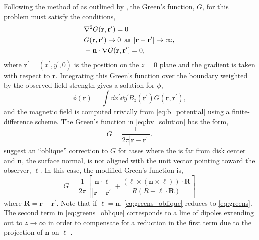 Following the method of \citet{schmidt_observable_1964} as outlined by \citet{sakurai_greens_1982}, the Green's function, $G$, for this problem must satisfy the conditions,
\begin{align}
    &\nabla^2G(\mathbf{r},\mathbf{r}^\prime) = 0, \nonumber \\
    &G(\mathbf{r},\mathbf{r}^\prime) \to 0 \enspace \textup{as} \enspace |\mathbf{r}-\mathbf{r}^\prime|\to\infty, \nonumber \\
    &-\mathbf{n}\cdot\nabla G(\mathbf{r},\mathbf{r}^\prime) = 0, \nonumber
\end{align} 
where $\mathbf{r}^\prime=(x^\prime,y^\prime,0)$ is the position on the $z=0$ plane and the gradient is taken with respect to $\mathbf{r}$. Integrating this Green's function over the boundary weighted by the observed field strength gives a solution for $\phi$,
\begin{equation}\label{eq:bv_solution}
    \phi(\mathbf{r}) = \int\dd{x^\prime}\dd{y^\prime}B_z(\mathbf{r}^\prime)G(\mathbf{r},\mathbf{r}^\prime),
\end{equation}
and the magnetic field is computed trivially from \autoref{eq:b_potential} using a finite-difference scheme. The Green's function in \autoref{eq:bv_solution} has the form,
\begin{equation}\label{eq:greens}
    G = \frac{1}{2\pi|\mathbf{r} - \mathbf{r}^\prime|}.
\end{equation}
\citet{schmidt_observable_1964} suggest an ``oblique'' correction to $G$ for cases where the \AR{} is far from disk center and $\mathbf{n}$, the surface normal, is not aligned with the unit vector pointing toward the observer, $\bm{\ell}$. In this case, the modified Green's function is,
\begin{equation}\label{eq:greens_oblique}
    G = \frac{1}{2\pi}\left[\frac{\mathbf{n}\cdot\bm{\ell}}{|\mathbf{r} - \mathbf{r}^\prime|} + \frac{(\bm{\ell}\times(\mathbf{n}\times\bm{\ell}))\cdot\mathbf{R}}{R(R + \bm{\ell}\cdot\mathbf{R})} \right]
\end{equation}
where $\mathbf{R}=\mathbf{r} - \mathbf{r}^\prime$. Note that if $\bm{\ell}=\mathbf{n}$, \autoref{eq:greens_oblique} reduces to \autoref{eq:greens}. The second term in \autoref{eq:greens_oblique} corresponds to a line of dipoles extending out to $z\to\infty$ in order to compensate for a reduction in the first term due to the projection of $\mathbf{n}$ on $\bm{\ell}$ \citep{sakurai_greens_1982}.

